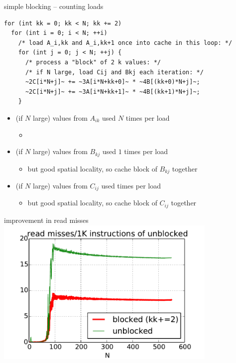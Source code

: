 \begin{frame}[fragile,label=cacheBlockKLoads]{simple blocking -- counting loads}
\begin{lstlisting}
for (int kk = 0; kk < N; kk += 2)
  for (int i = 0; i < N; ++i)
    /* load A_i,kk and A_i,kk+1 once into cache in this loop: */
    for (int j = 0; j < N; ++j) {
      /* process a "block" of 2 k values: */
      /* if N large, load Cij and Bkj each iteration: */
      ~2C[i*N+j]~ += ~3A[i*N+kk+0]~ * ~4B[(kk+0)*N+j]~;
      ~2C[i*N+j]~ += ~3A[i*N+kk+1]~ * ~4B[(kk+1)*N+j]~;
    }
\end{lstlisting}
\begin{itemize}
\item (if $N$ large) values from $A_{ik}$ used $N$ times per load
    \begin{itemize}
    \item {}
    \end{itemize}
\item (if $N$ large) values from $B_{kj}$ used $1$ times per load
    \begin{itemize}
    \item but good spatial locality, so cache block of $B_{kj}$ together
    \end{itemize}
\item (if $N$ large) values from $C_{ij}$ used  times per load
    \begin{itemize}
    \item but good spatial locality, so cache block of $C_{ij}$ together
    \end{itemize}
\end{itemize}
\end{frame}

\begin{frame}{improvement in read misses}
\includegraphics[width=0.8\textwidth]{../caching/k-kk-novec-block-read_miss_rate}
\end{frame}

